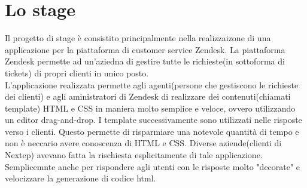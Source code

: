 \section{Lo stage}
Il progetto di stage è consistito principalmente nella realizzaizone di una applicazione per la piattaforma di customer service Zendesk. La piattaforma Zendesk permette ad un'aziedna di gestire tutte le richieste(in sottoforma di tickets) di propri clienti in unico posto. \\ L'applicazione realizzata permette agli agenti(persone che gestiscono le richieste dei clienti) e agli aministratori di Zendesk di realizzare dei contenuti(chiamati template) HTML e CSS in maniera molto semplice e veloce, ovvero utilizzando un editor drag-and-drop. I template successivamente sono utilizzati nelle risposte verso i clienti. Questo permette di risparmiare una notevole quantità di tempo e non è neccario avere conoscenza di HTML e CSS. Diverse aziende(clienti di Nextep) avevano fatta la rischiesta esplicitamente di tale applicazione. Semplicemnte anche per rispondere agli utenti con le risposte molto "decorate" e velocizzare la generazione di codice html.